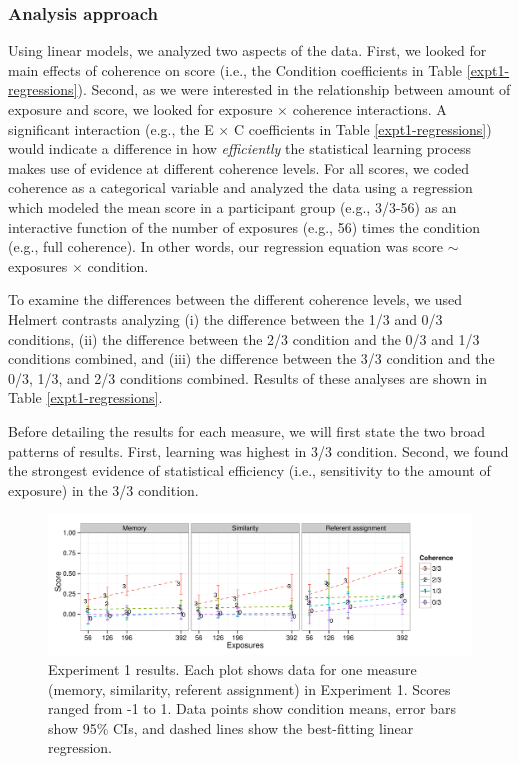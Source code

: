\documentclass[man,floatsintext]{apa6}
\begin{document}
\subsubsection{Analysis approach}
Using linear models, we analyzed two aspects of the data. First, we looked for main effects of coherence on score (i.e., the Condition coefficients in Table \ref{expt1-regressions}). Second, as we were interested in the relationship between amount of exposure and score, we looked for exposure $\times$ coherence interactions. A significant interaction (e.g., the E $\times$ C coefficients in Table \ref{expt1-regressions}) would indicate a difference in how \emph{efficiently} the statistical learning process makes use of evidence at different coherence levels. For all scores, we coded coherence as a categorical variable and analyzed the data using a regression which modeled the mean score in a participant group (e.g., 3/3-56) as an interactive function of the number of exposures (e.g., 56) times the condition (e.g., full coherence). In other words, our regression equation was score $\sim$ exposures $\times$ condition.

To examine the differences between the different coherence levels, we used Helmert contrasts analyzing (i) the difference between the 1/3 and 0/3 conditions, (ii) the difference between the 2/3 condition and the 0/3 and 1/3 conditions combined, and (iii) the difference between the 3/3 condition and the 0/3, 1/3, and 2/3 conditions combined. Results of these analyses are shown in Table \ref{expt1-regressions}.

Before detailing the results for each measure, we will first state the two broad patterns of results. First, learning was highest in 3/3 condition. Second, we found the strongest evidence of statistical efficiency (i.e., sensitivity to the amount of exposure) in the 3/3 condition.

\begin{figure}[t]
  \begin{center}
    \includegraphics[width=1.0\linewidth]{x1}
    \caption{Experiment 1 results. Each plot shows data for one measure (memory, similarity, referent assignment) in Experiment 1. Scores ranged from -1 to 1. Data points show condition means, error bars show 95\% CIs, and dashed lines show the best-fitting linear regression.}
    \label{expt1-results}
  \end{center}
\end{figure}
\end{document}
